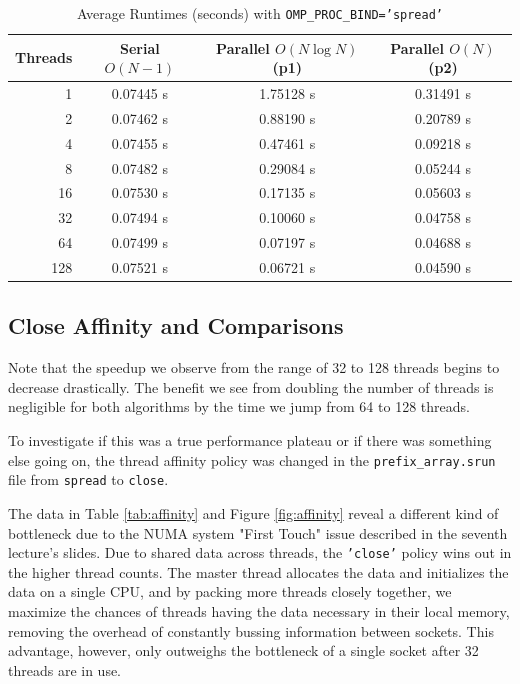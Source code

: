 \documentclass[11pt, letterpaper]{article}
\begin{document}
\begin{table}[h!]
    \centering
    \caption{Average Runtimes (seconds) with \texttt{OMP\_PROC\_BIND='spread'}}
    \label{tab:spread}
    \begin{tabular}{rccc}
        \toprule
        Threads & Serial $O(N-1)$ & Parallel $O(N \log N)$ (p1) & Parallel $O(N)$ (p2) \\
        \midrule
        1   & 0.07445 s & 1.75128 s & 0.31491 s \\
        2   & 0.07462 s & 0.88190 s & 0.20789 s \\
        4   & 0.07455 s & 0.47461 s & 0.09218 s \\
        8   & 0.07482 s & 0.29084 s & 0.05244 s \\
        16  & 0.07530 s & 0.17135 s & 0.05603 s \\
        32  & 0.07494 s & 0.10060 s & 0.04758 s \\
        64  & 0.07499 s & 0.07197 s & 0.04688 s \\
        128 & 0.07521 s & 0.06721 s & 0.04590 s \\
        \bottomrule
    \end{tabular}
\end{table}

\subsection{Close Affinity and Comparisons}

Note that the speedup we observe from the range of 32 to 128 threads begins to decrease drastically. The benefit we see from doubling the number of threads is negligible for both algorithms by the time we jump from 64 to 128 threads.

To investigate if this was a true performance plateau or if there was something else going on, the thread affinity policy was changed in the \texttt{prefix\_array.srun} file from \texttt{spread} to \texttt{close}.

The data in Table \ref{tab:affinity} and Figure \ref{fig:affinity} reveal a different kind of bottleneck due to the NUMA system "First Touch" issue described in the seventh lecture's slides. Due to shared data across threads, the \texttt{'close'} policy wins out in the higher thread counts. The master thread allocates the data and initializes the data on a single CPU, and by packing more threads closely together, we maximize the chances of threads having the data necessary in their local memory, removing the overhead of constantly bussing information between sockets. This advantage, however, only outweighs the bottleneck of a single socket after 32 threads are in use.
\end{document}
